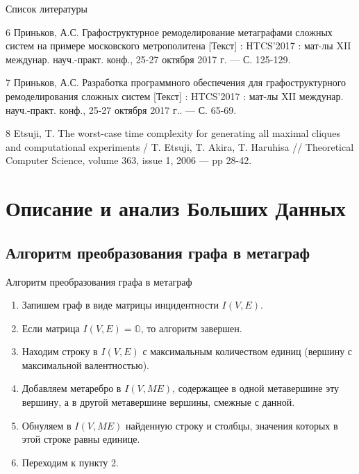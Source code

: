 \documentclass{beamer}
\begin{document}
\begin{darkframes}
\begin{frame}[label=bibliography]{Список литературы}
\begin{thebibliography}{9}
{				\item[6] Приньков, А.С. Графоструктурное ремоделирование метаграфами сложных систем на примере московского метрополитена [Текст] : HTCS'2017 : мат-лы XII междунар. науч.-практ. конф., 25-27 октября 2017 г. --- С. 125-129.

				\item[7] Приньков, А.С. Разработка программного обеспечения для графоструктурного ремоделирования сложных систем [Текст] : HTCS'2017 : мат-лы XII междунар. науч.-практ. конф., 25-27 октября 2017 г.. --- С. 65-69.

				\item[8] Etsuji, T. The worst-case time complexity for generating all maximal cliques and computational experiments / T. Etsuji, T. Akira, T. Haruhisa // Theoretical Computer Science, volume 363, issue 1, 2006 --- pp 28-42.


			}

			\end{thebibliography}
		\end{frame}


\section{Описание и анализ Больших Данных}
\subsection{Алгоритм преобразования графа в метаграф}
		\begin{frame}{Алгоритм преобразования графа в метаграф}
			\begin{enumerate}
				\item Запишем граф в виде матрицы инцидентности $I(V,E)$.
				\item Если матрица $I(V,E)=\mathbb{O}$, то алгоритм завершен.
				\item Находим строку в $I(V,E)$ с максимальным количеством единиц (вершину с максимальной валентностью).
				\item Добавляем метаребро в $I(V,ME)$, содержащее в одной метавершине эту вершину, а в другой метавершине вершины, смежные с данной.
				\item Обнуляем в $I(V,ME)$ найденную строку и столбцы, значения которых в этой строке равны единице.
				\item Переходим к пункту 2.
			\end{enumerate}
		\end{frame}


\end{darkframes}
\end{document}
